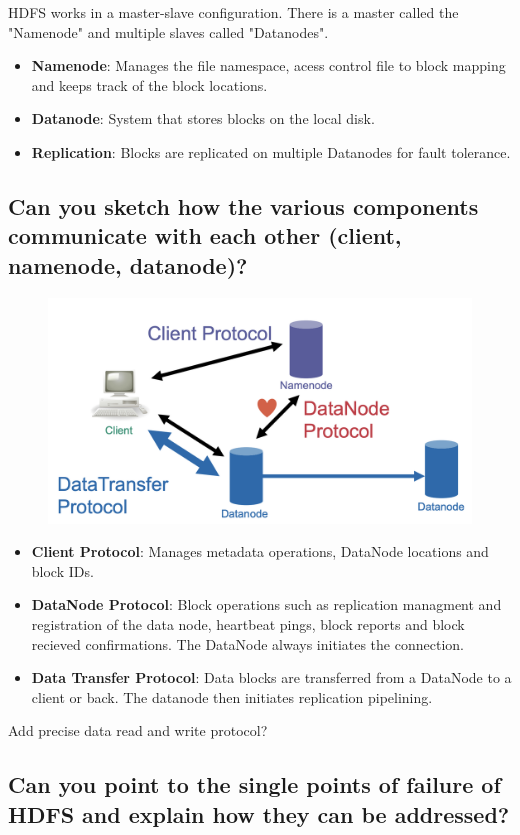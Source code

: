\documentclass{article}
\begin{document}
HDFS works in a master-slave configuration. There is a master called the "Namenode" and multiple slaves called "Datanodes".

\begin{itemize}
    \item \textbf{Namenode}: Manages the file namespace, acess control file to block mapping and keeps track of the block locations.
    \item \textbf{Datanode}: System that stores blocks on the local disk.
    \item \textbf{Replication}: Blocks are replicated on multiple Datanodes for fault tolerance.
\end{itemize}

\subsection{Can you sketch how the various components communicate with each other (client, namenode, datanode)?}

\begin{figure}
    \centering
    \includegraphics[width=0.5\linewidth]{img/hdfsoverview.png}
\end{figure}

\begin{itemize}
    \item \textbf{Client Protocol}: Manages metadata operations, DataNode locations and block IDs.
    \item \textbf{DataNode Protocol}: Block operations such as replication managment and registration of the data node, heartbeat pings, block reports and block recieved confirmations. The DataNode always initiates the connection.
    \item \textbf{Data Transfer Protocol}: Data blocks are transferred from a DataNode to a client or back. The datanode then initiates replication pipelining.
\end{itemize}

{\color{red} Add precise data read and write protocol?}

\subsection{Can you point to the single points of failure of HDFS and explain how they can be addressed?}
\end{document}
